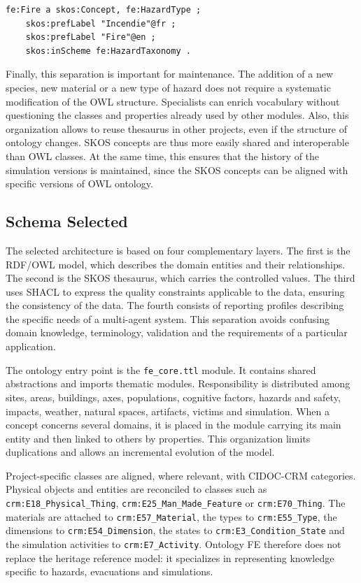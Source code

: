 \documentclass{article}
\begin{document}
\begin{lstlisting}[language=Turtle,caption={Example of a controlled concept in a SKOS thesaurus}]
fe:Fire a skos:Concept, fe:HazardType ;
    skos:prefLabel "Incendie"@fr ;
    skos:prefLabel "Fire"@en ;
    skos:inScheme fe:HazardTaxonomy .
\end{lstlisting}

Finally, this separation is important for maintenance. The addition of a new species, new material or a new type of hazard does not require a systematic modification of the OWL structure. Specialists can enrich vocabulary without questioning the classes and properties already used by other modules. Also, this organization allows to reuse thesaurus in other projects, even if the structure of ontology changes. SKOS concepts are thus more easily shared and interoperable than OWL classes. At the same time, this ensures that the history of the simulation versions is maintained, since the SKOS concepts can be aligned with specific versions of OWL ontology.

\subsection{Schema Selected }

The selected architecture is based on four complementary layers. The first is the RDF/OWL model, which describes the domain entities and their relationships. The second is the SKOS thesaurus, which carries the controlled values. The third uses SHACL to express the quality constraints applicable to the data, ensuring the consistency of the data. The fourth consists of reporting profiles describing the specific needs of a multi-agent system. This separation avoids confusing domain knowledge, terminology, validation and the requirements of a particular application.

The ontology entry point is the \texttt{fe\_core.ttl} module. It contains shared abstractions and imports thematic modules. Responsibility is distributed among sites, areas, buildings, axes, populations, cognitive factors, hazards and safety, impacts, weather, natural spaces, artifacts, victims and simulation. When a concept concerns several domains, it is placed in the module carrying its main entity and then linked to others by properties. This organization limits duplications and allows an incremental evolution of the model.

Project-specific classes are aligned, where relevant, with CIDOC-CRM categories. Physical objects and entities are reconciled to classes such as \texttt{crm:E18\_Physical\_Thing}, \texttt{crm:E25\_Man\_Made\_Feature} or \texttt{crm:E70\_Thing}. The materials are attached to \texttt{crm:E57\_Material}, the types to \texttt{crm:E55\_Type}, the dimensions to \texttt{crm:E54\_Dimension}, the states to \texttt{crm:E3\_Condition\_State} and the simulation activities to \texttt{crm:E7\_Activity}. Ontology FE therefore does not replace the heritage reference model: it specializes in representing knowledge specific to hazards, evacuations and simulations.
\end{document}
